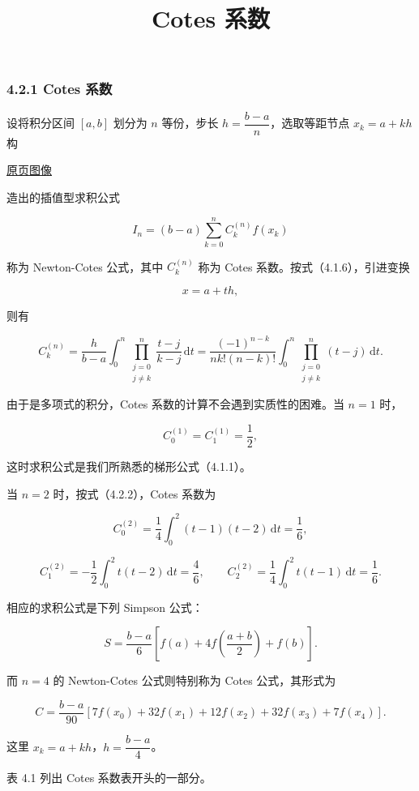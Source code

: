 \documentclass[
  10pt,
  fontset=fandol]{ctexart}
\title{Cotes 系数}
\author{}
\date{}
\begin{document}
\maketitle

\subsubsection{4.2.1 Cotes 系数}\label{cotes-ux7cfbux6570}

设将积分区间 \([a,b]\) 划分为 \(n\) 等份，步长 \(h=\dfrac{b-a}{n}\)，选取等距节点 \(x_k=a+kh\) 构

\href{../../source-images/pdf-096.jpeg}{原页图像}

造出的插值型求积公式

\[
I_n=(b-a)\sum_{k=0}^n C_k^{(n)}f(x_k)
\tag{4.2.1}
\]

称为 Newton-Cotes 公式，其中 \(C_k^{(n)}\) 称为 Cotes 系数。按式（4.1.6），引进变换

\[
x=a+th,
\]

则有

\[
C_k^{(n)}=\frac{h}{b-a}\int_0^n\prod_{\substack{j=0\\j\ne k}}^n\frac{t-j}{k-j}\,\mathrm{d}t
=\frac{(-1)^{n-k}}{nk!(n-k)!}\int_0^n\prod_{\substack{j=0\\j\ne k}}^n(t-j)\,\mathrm{d}t.
\tag{4.2.2}
\]

由于是多项式的积分，Cotes 系数的计算不会遇到实质性的困难。当 \(n=1\) 时，

\[
C_0^{(1)}=C_1^{(1)}=\frac12,
\]

这时求积公式是我们所熟悉的梯形公式（4.1.1）。

当 \(n=2\) 时，按式（4.2.2），Cotes 系数为

\[
C_0^{(2)}=\frac14\int_0^2(t-1)(t-2)\,\mathrm{d}t=\frac16,
\]

\[
C_1^{(2)}=-\frac12\int_0^2t(t-2)\,\mathrm{d}t=\frac46,\qquad
C_2^{(2)}=\frac14\int_0^2t(t-1)\,\mathrm{d}t=\frac16.
\]

相应的求积公式是下列 Simpson 公式：

\[
S=\frac{b-a}{6}\left[f(a)+4f\left(\frac{a+b}{2}\right)+f(b)\right].
\tag{4.2.3}
\]

而 \(n=4\) 的 Newton-Cotes 公式则特别称为 Cotes 公式，其形式为

\[
C=\frac{b-a}{90}[7f(x_0)+32f(x_1)+12f(x_2)+32f(x_3)+7f(x_4)].
\tag{4.2.4}
\]

这里 \(x_k=a+kh\)，\(h=\dfrac{b-a}{4}\)。

表 4.1 列出 Cotes 系数表开头的一部分。
\end{document}
